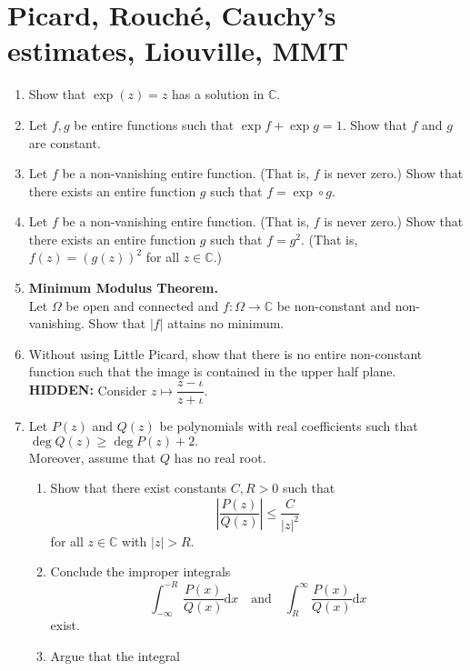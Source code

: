 \documentclass[12pt]{article}
\theoremstyle{definition}
\numberwithin{thm}{section}
\newcommand{\hint}[1]{\textbf{HIDDEN:} {\color[rgb]{0.95, 0.95, 0.95}#1}}
\begin{document}
%
\newpage\section{Picard, Rouch\'{e}, Cauchy's estimates, Liouville, MMT}
\begin{enumerate}
	\item Show that $\exp(z) = z$ has a solution in $\mathbb{C}.$
	\item Let $f, g$ be entire functions such that $\exp f + \exp g = 1.$ Show that $f$ and $g$ are constant.
	\item Let $f$ be a non-vanishing entire function. (That is, $f$ is never zero.) Show that there exists an entire function $g$ such that $f = \exp\circ g.$
	\item Let $f$ be a non-vanishing entire function. (That is, $f$ is never zero.) Show that there exists an entire function $g$ such that $f = g^2.$ (That is, $f(z) = (g(z))^2$ for all $z \in \mathbb{C}.$)
	\item \textbf{Minimum Modulus Theorem.} \\
	Let $\Omega$ be open and connected and $f:\Omega\to\mathbb{C}$ be non-constant and non-vanishing. Show that $|f|$ attains no minimum.
	\item Without using Little Picard, show that there is no entire non-constant function such that the image is contained in the upper half plane.\\
	\hint{Consider $z \mapsto \dfrac{z - \iota}{z + \iota}.$}
	\item Let $P(z)$ and $Q(z)$ be polynomials with real coefficients such that $\deg Q(z) \ge \deg P(z) + 2.$ \\
	Moreover, assume that $Q$ has no real root.
	\begin{enumerate}
		\item Show that there exist constants $C, R > 0$ such that
		\begin{equation*} 
			\left|\dfrac{P(z)}{Q(z)}\right| \le \dfrac{C}{|z|^2}
		\end{equation*}
		for all $z \in \mathbb{C}$ with $|z| > R.$
		\item Conclude the improper integrals
		\begin{equation*} 
			\int_{-\infty}^{-R} \dfrac{P(x)}{Q(x)} {\mathrm{d}}x \quad\text{and}\quad \int_{R}^{\infty} \dfrac{P(x)}{Q(x)} {\mathrm{d}}x
		\end{equation*}
		exist.
		\item Argue that the integral
		\begin{equation*} 

\end{equation*}
\end{enumerate}
\end{enumerate}
\end{document}
